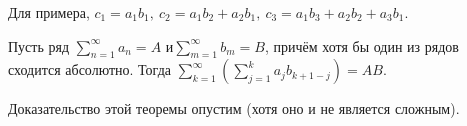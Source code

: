 	Для примера, $c_1 = a_1b_1,\ c_2 = a_1b_2 + a_2b_1,\ c_3 = a_1b_3+a_2b_2+a_3b_1$.
	
	\begin{Theorem}[Мертенса]
		Пусть ряд $\sum\limits_{n=1}^{\infty}a_n = A $ и$ \sum\limits_{m=1}^{\infty}b_m = B$, причём хотя бы один из рядов сходится абсолютно. Тогда $\sum\limits_{k=1}^{\infty}\left(\sum\limits_{j=1}^{k}a_jb_{k+1-j}\right) = AB.$
	\end{Theorem}
	
	Доказательство этой теоремы опустим (хотя оно и не является сложным).
